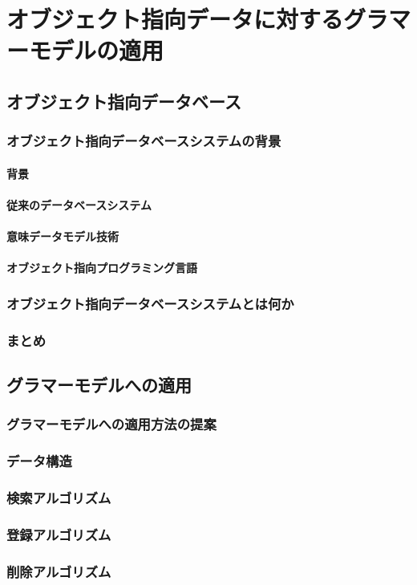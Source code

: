 \chapter{オブジェクト指向データに対するグラマーモデルの適用}
\thispagestyle{myheadings}

\section{オブジェクト指向データベース}

\subsection{オブジェクト指向データベースシステムの背景}

\subsubsection{背景}

\subsubsection{従来のデータベースシステム}

\subsubsection{意味データモデル技術}

\subsubsection{オブジェクト指向プログラミング言語}

\subsection{オブジェクト指向データベースシステムとは何か}

\subsection{まとめ}

\section{グラマーモデルへの適用}

\subsection{グラマーモデルへの適用方法の提案}

\subsection{データ構造}

\subsection{検索アルゴリズム}

\subsection{登録アルゴリズム}

\subsection{削除アルゴリズム}

